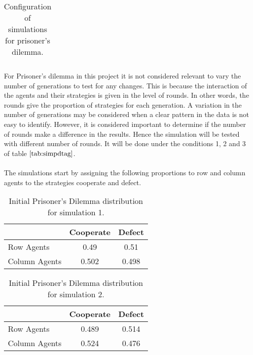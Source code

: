 \begin{table}[H]
\begin{center}
{\begin{tabular}{|c|c|c|c|c|c|c|}
\end{tabular}}
\end{center}
\caption{Configuration of simulations for prisoner's dilemma.}
\label{tab:simpdtag}
\end{table}

\newpage

For Prisoner's dilemma in this project it is not considered relevant to vary the number of generations to test for any changes. This is because the interaction of the agents and their strategies is given in the level of rounds. In other words, the rounds give the proportion of strategies for each generation. A variation in the number of generations may be considered when a clear pattern in the data is not easy to identify. However, it is considered important to determine if the number of rounds make a difference in the results. Hence the simulation will be tested  with different number of rounds. It will be done under the conditions 1, 2 and 3 of table $\ref{tab:simpdtag}$.
\\\\The simulations start by assigning the following proportions to row and column agents to the strategies cooperate and defect.

\begin{table}[H]
\begin{center}
\begin{tabular}{|l|c|c|}
\hline
& Cooperate & Defect \\ 
\hline
Row Agents & 0.49 & 0.51\\

\hline
Column Agents & 0.502 & 0.498\\
\hline
\end{tabular}
\end{center}
\caption{ Initial Prisoner’s Dilemma distribution for simulation 1.}
\label{tab:pds1g1}
\end{table}

\begin{table}[H]
\begin{center}
\begin{tabular}{|l|c|c|}
\hline
& Cooperate & Defect \\ 
\hline
Row Agents & 0.489 & 0.514\\
\hline
Column Agents & 0.524 & 0.476\\
\hline
\end{tabular}
\end{center}
\caption{Initial Prisoner’s Dilemma distribution for simulation 2.}
\label{tab:pds2g1}
\end{table}

